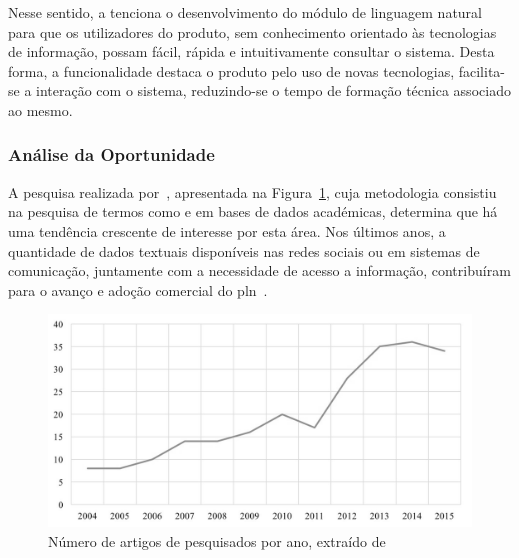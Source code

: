 Nesse sentido, a {\companyname} tenciona o desenvolvimento do módulo de linguagem natural para que os utilizadores do produto, sem conhecimento orientado às tecnologias de informação, possam fácil, rápida e intuitivamente consultar o sistema. Desta forma, a funcionalidade destaca o produto pelo uso de novas tecnologias, facilita-se a interação com o sistema, reduzindo-se o tempo de formação técnica associado ao mesmo. 

\subsubsection*{Análise da Oportunidade}
A pesquisa realizada por~\textcite{roadmap_nlp_research_is}, apresentada na Figura~\ref{fig:number_articles_per_year_nlp}, cuja metodologia consistiu na pesquisa de termos como  e  em bases de dados académicas, determina que há uma tendência crescente de interesse por esta área. Nos últimos anos, a quantidade de dados textuais disponíveis nas redes sociais ou em sistemas de comunicação, juntamente com a necessidade de acesso a informação, contribuíram para o avanço e adoção comercial do \gls{pln}~\parencite{roadmap_nlp_research_is}.

\begin{figure}[!ht]
    \centering
    \includegraphics[width=.9\textwidth]{ch02/assets/number_articles_nlp.jpg}
    \caption{Número de artigos de  pesquisados por ano, extraído de~\textcite{roadmap_nlp_research_is}}
    \label{fig:number_articles_per_year_nlp}
\end{figure}

